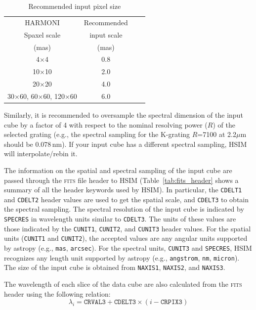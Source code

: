 \documentclass[12pt]{report}
\begin{document}
\begin{table}[h]
\centering
\caption{Recommended input pixel size}
\label{tab:scale}
\begin{tabular}{cccc}
\hline
HARMONI & Recommended\\
Spaxel scale & input scale\\
(mas) & (mas) \\
\hline
4$\times$4   & 0.8 \\
10$\times$10 & 2.0 \\
20$\times$20 & 4.0 \\
30$\times$60, 60$\times$60, 120$\times$60 & 6.0 \\
\hline
\end{tabular}
\end{table}

Similarly, it is recommended to oversample the spectral dimension of the input cube by a factor of 4 with respect to the nominal resolving power ($R$) of the selected grating (e.g., the spectral sampling for the K-grating $R$=7100 at 2.2$\mu$m should be 0.078\,nm). If your input cube has a different spectral sampling, HSIM will interpolate\slash rebin it. 

The information on the spatial and spectral sampling of the input cube are passed through the \textsc{fits} file header to HSIM (Table~\ref{tab:fits_header} shows a summary of all the header keywords used by HSIM). In particular, the \texttt{CDELT1} and \texttt{CDELT2} header values are used to get the spatial scale, and \texttt{CDELT3} to obtain the spectral sampling. The spectral resolution of the input cube is indicated by \texttt{SPECRES} in wavelength units similar to \texttt{CDELT3}. The units of these values are those indicated by the \texttt{CUNIT1}, \texttt{CUNIT2}, and \texttt{CUNIT3} header values. For the spatial units (\texttt{CUNIT1} and \texttt{CUNIT2}), the accepted values are any angular units supported by astropy (e.g., \texttt{mas}, \texttt{arcsec}). For the spectral units, \texttt{CUNIT3} and \texttt{SPECRES}, HSIM recognizes any length unit supported by astropy (e.g., \texttt{angstrom}, \texttt{nm}, \texttt{micron}). The size of the input cube is obtained from \texttt{NAXIS1}, \texttt{NAXIS2}, and \texttt{NAXIS3}.


The wavelength of each slice of the data cube are also calculated from the \textsc{fits} header using the following relation:
\begin{equation}\label{eq:lambda}
\lambda_i = \texttt{CRVAL3} + \texttt{CDELT3} \times (i - \texttt{CRPIX3})
\end{equation}
\end{document}
